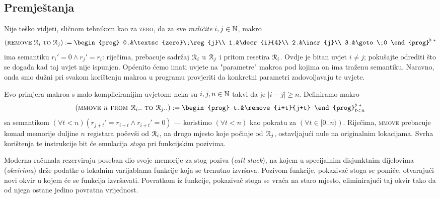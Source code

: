\subsection{Premještanja}\label{sec:move}

Nije teško vidjeti, sličnom tehnikom kao za \textsc{zero}, da za sve \emph{različite} $i,j\in{\mathbb N}$, makro
\begin{equation}
    (\remove{i}{j}):=\begin{prog}
    0.&\textsc{zero}\;\reg{j}\\
    1.&\decr{i}{4}\\
    2.&\incr{j}\\
    3.&\goto\;0
    \end{prog}^{\flat\;*}
\end{equation}
ima semantiku $r_i'=0\land r_j'=r_i$: riječima, prebacuje sadržaj $\mathcal R_{i}$ u $\mathcal R_{j}$ i pritom resetira $\mathcal R_{i}$. Ovdje je bitan uvjet $i\not=j$; pokušajte odrediti što se događa kad taj uvjet nije ispunjen. Općenito ćemo imati uvjete na "parametre" makroa pod kojima on ima traženu semantiku. Naravno, onda smo dužni pri svakom korištenju makroa u programu provjeriti da konkretni parametri zadovoljavaju te uvjete.

Evo primjera makroa s malo kompliciranijim uvjetom: neka su $i,j,n\in{\mathbb N}$ takvi da je $\left|i-j\right|\ge n$. Definiramo makro
\begin{equation}
    (\textsc{mmove $n$ from $\reg{i}..$ to $\reg{j}..$}):=\begin{prog}
    t.&\remove{i+t}{j+t}
    \end{prog}_{t<n}^{\flat\;*}
\end{equation}
sa semantikom $(\forall t<n)(r_{j+t}'=r_{i+t}\land r_{i+t}'=0)$ --- koristimo $(\forall t<n)$ kao pokratu za $(\forall t\in[0..n\rangle)$. Riječima, \textsc{mmove} prebacuje komad memorije duljine $n$ registara počevši od $\mathcal R_{i}$, na drugo mjesto koje počinje od $\mathcal R_{j}$, ostavljajući nule na originalnim lokacijama. Svrha korištenja te instrukcije bit će emulacija \emph{stoga} pri funkcijskim pozivima.

Moderna računala rezerviraju poseban dio svoje memorije za stog poziva (\emph{call stack}), na kojem u specijalnim disjunktnim dijelovima (\emph{okvirima}) drže podatke o lokalnim varijablama funkcije koja se trenutno izvršava. Pozivom funkcije, pokazivač stoga se pomiče, otvarajući novi okvir u kojem će se funkcija izvršavati. Povratkom iz funkcije, pokazivač stoga se vraća na staro mjesto, eliminirajući taj okvir tako da od njega ostane jedino povratna vrijednost.

